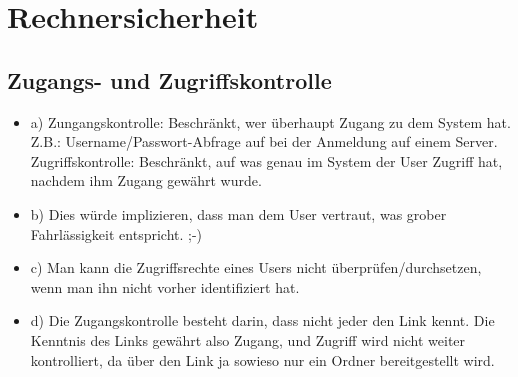 \documentclass[ngerman]{fbi-aufgabenblatt}
\begin{document}
\section{Rechnersicherheit}
    \subsection{Zugangs- und Zugriffskontrolle}
        \begin{itemize}
            \item a)
                \subitem Zungangskontrolle: Beschränkt, wer überhaupt Zugang zu dem System hat. Z.B.: Username/Passwort-Abfrage auf bei der Anmeldung auf einem Server.
                \subitem Zugriffskontrolle: Beschränkt, auf was genau im System der User Zugriff hat, nachdem ihm Zugang gewährt wurde.
            \item b)
                Dies würde implizieren, dass man dem User vertraut, was grober Fahrlässigkeit entspricht. ;-) \\
            \item c)
                Man kann die Zugriffsrechte eines Users nicht überprüfen/durchsetzen, wenn man ihn nicht vorher identifiziert hat.
            \item d)
                Die Zugangskontrolle besteht darin, dass nicht jeder den Link kennt. Die Kenntnis des Links gewährt also Zugang, und Zugriff wird nicht weiter kontrolliert, da über den Link ja sowieso nur ein Ordner bereitgestellt wird.
                
        \end{itemize}
\end{document}
